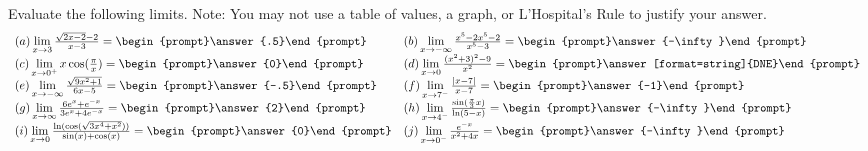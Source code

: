 \documentclass{ximera}
\author{Tom Dinitz and Nela Lakos}
\begin{document}
\begin{exercise}

  Evaluate the following limits. Note: You may not use a table of values, a graph,
  or L'Hospital's Rule to justify your answer.
\[
\begin{array}{l l}
  (a) \lim\limits_{x\to 3} \frac{\sqrt{2x-2}-2}{x-3}=\begin{prompt}\answer{.5}\end{prompt}
	&
  (b) \lim\limits_{x\to -\infty} \frac{x^5-2x^5-2}{x^5-3}=\begin{prompt}\answer{-\infty}\end{prompt} \\
  (c) \lim\limits_{x\to 0^+} x\cos(\frac{\pi}{x})=\begin{prompt}\answer{0}\end{prompt} &
  (d) \lim\limits_{x\to 0} \frac{(x^2+3)^2-9}{x^2}=\begin{prompt}\answer[format=string]{DNE}\end{prompt}\\
  (e) \lim\limits_{x\to -\infty} \frac{\sqrt{9x^2+1}}{6x-5}=\begin{prompt}\answer{-.5}\end{prompt} &
  (f) \lim\limits_{x\to 7^-} \frac{|x-7|}{x-7}=\begin{prompt}\answer{-1}\end{prompt}\\
  (g) \lim\limits_{x\to \infty} \frac{6e^x+e^{-x}}{3e^x+4e^{-x}}=\begin{prompt}\answer{2}\end{prompt}&
  (h) \lim\limits_{x\to 4^-} \frac{\sin(\frac{\pi}{3}x)}{\ln(5-x)}=\begin{prompt}\answer{-\infty}\end{prompt}\\
  (i) \lim\limits_{x\to 0} \frac{\ln(\cos(\sqrt{3x^4+x^2}))}{\sin(x)+\cos(x)}=\begin{prompt}\answer{0}\end{prompt}
&
  (j) \lim\limits_{x\to 0^-} \frac{e^{-x}}{x^2+4x}=\begin{prompt}\answer{-\infty}\end{prompt}
\end{array}
\]
\end{exercise}
\end{document}

